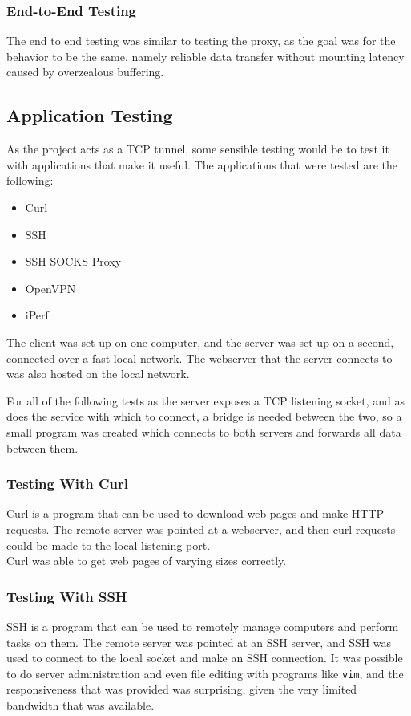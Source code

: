 \subsubsection*{End-to-End Testing}
The end to end testing was similar to testing the proxy, as the goal was for the behavior to be the same, namely reliable data transfer without mounting latency caused by overzealous buffering.

\subsection{Application Testing}
As the project acts as a TCP tunnel, some sensible testing would be to test it with applications that make it useful.
The applications that were tested are the following:
\begin{itemize}
    \item Curl
    \item SSH
    \item SSH SOCKS Proxy
    \item OpenVPN
    \item iPerf
\end{itemize}

The client was set up on one computer, and the server was set up on a second, connected over a fast local network.
The webserver that the server connects to was also hosted on the local network.\par

For all of the following tests as the server exposes a TCP listening socket, and as does the service with which to connect, a bridge is needed between the two, so a small program was created which connects to both servers and forwards all data between them.

\subsubsection*{Testing With Curl}
Curl is a program that can be used to download web pages and make HTTP requests.
The remote server was pointed at a webserver, and then curl requests could be made to the local listening port.\\
Curl was able to get web pages of varying sizes correctly.

\subsubsection*{Testing With SSH}
SSH is a program that can be used to remotely manage computers and perform tasks on them.
The remote server was pointed at an SSH server, and SSH was used to connect to the local socket and make an SSH connection.
It was possible to do server administration and even file editing with programs like \texttt{vim}, and the responsiveness that was provided was surprising, given the very limited bandwidth that was available.

